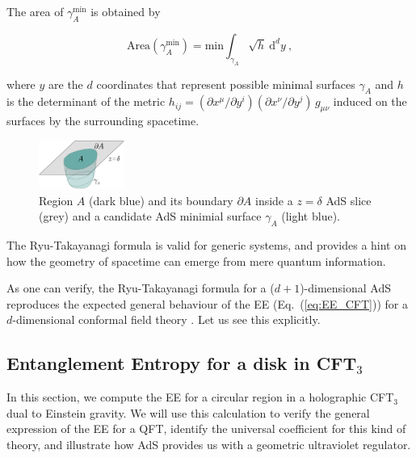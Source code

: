 \documentclass[twocolumn]{revtex4}
\providecommand{\eq}[2]{
    \begin{equation}
        #2
    \label{eq:#1}
    \end{equation}
}
\begin{document}
The area of $\gamma_A^\text{min}$ is obtained by
\eq{EE_RT-area}{
    \text{Area}(\gamma_A^\text{min}) ={\text{min}} \int_{\gamma_A} \sqrt{h} \ \mathrm{d}^{d}y \ ,
}
where $y$ are the $d$ coordinates that represent possible minimal surfaces $\gamma_A$ and $h$ is the determinant of the metric $h_{ij} = (\partial x^\mu / \partial y^i) (\partial x^\nu / \partial y^j) \, g_{\mu\nu}$ induced on the surfaces by the surrounding spacetime.

\begin{figure}
    \centering
    \includegraphics[width=0.25\textwidth]{../imatges/EE_AdS-CFT-D.png}
\caption{Region $A$ (dark blue) and its boundary $\partial A$ inside a $z=\delta$ AdS slice (grey) and a candidate AdS minimial surface $\gamma_A$ (light blue).}
\label{fig:EE_AdS-CFT}
\end{figure}

The Ryu-Takayanagi formula is valid for generic systems, and provides a hint on how the geometry of spacetime can emerge from mere quantum information.

As one can verify, the Ryu-Takayanagi formula for a ($d+1$)-dimensional AdS reproduces the expected general behaviour of the EE (Eq.~(\ref{eq:EE_CFT})) for a $d$-dimensional conformal field theory \cite{ryu_aspects_2006, nishioka_holographic_2009}. Let us see this explicitly.


\subsection{Entanglement Entropy for a disk in CFT\texorpdfstring{$_3$}{3}} \label{ss:EE-disk}

In this section, we compute the EE for a circular region in a holographic CFT$_3$ dual to Einstein gravity. We will use this calculation to verify the general expression of the EE for a QFT, identify the universal coefficient for this kind of theory, and illustrate how AdS provides us with a geometric ultraviolet regulator.
\end{document}
